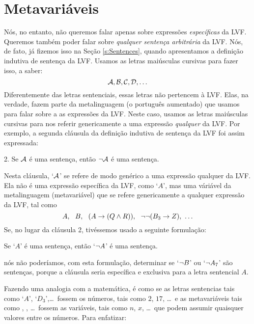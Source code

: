 \section{Metavariáveis}\label{s:Metavariables}
Nós, no entanto, não queremos falar apenas sobre expressões \emph{específicas} da LVF. 
Queremos também poder falar sobre \emph{qualquer sentença arbitrária} da LVF.
Nós, de fato, já fizemos isso na Seção \ref{s:Sentences}, quando apresentamos a definição indutiva de sentença da LVF.
Usamos as letras maiúsculas cursivas para fazer isso, a saber:
	$$\mathcal{A}, \mathcal{B}, \mathcal{C}, \mathcal{D}, \ldots$$
Diferentemente das letras sentenciais, essas letras não pertencem à LVF.
Elas, na verdade, fazem parte da metalinguagem (o português aumentado) que usamos para falar sobre a as expressões da LVF.
Neste caso, usamos as letras maiúsculas cursivas para nos referir genericamente a uma expressão \emph{qualquer} da LVF.
Por exemplo, a segunda cláusula da definição indutiva de sentença da LVF foi assim expressada:
	\begin{earg}
		\item[2.] Se $\mathcal{A}$ é uma sentença, então $\neg \mathcal{A}$ é uma sentença.
	\end{earg}
Nesta cláusula, `$\mathcal{A}$' se refere de modo genérico a uma expressão qualquer da LVF.
Ela não é uma expressão específica da LVF, como `$A$', mas uma váriável da metalinguagem (metavariável) que se refere genericamente a qualquer expressão da LVF, tal como $$A,\ \ B,\ \  (A \eif (Q \eand R)),\ \  \enot\enot(B_3 \eif Z),\ \ldots$$
Se, no lugar da cláusula 2, tivéssemos usado a seguinte formulação:
	\begin{ebullet}
		\item Se `$A$' é uma sentença, então `$\neg A$' é uma sentença.
	\end{ebullet}
nós não poderíamos, com esta formulação, determinar se `$\neg B$' ou `$\neg A_7$' são sentenças, porque a cláusula seria específica e exclusiva para a letra sentencial $A$.

Fazendo uma analogia com a matemática, é como se as letras sentencias tais como `$A$', `$D_3$',\ldots\ fossem os números, tais como $2$, $17$, \ldots\ e as metavariáveis tais como , , \ldots\ fossem as variáveis, tais como $n$, $x$, \ldots\ que podem assumir quaisquer valores entre os números.
Para enfatizar:

